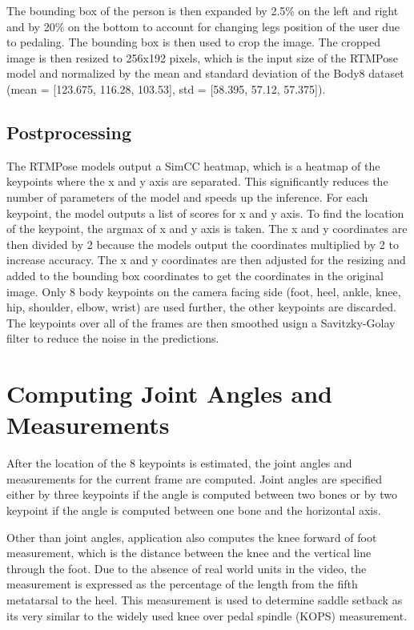 The bounding box of the person is then expanded by 2.5\% on the left and right and by 20\% on the bottom to account for changing legs position of the user due to pedaling. The bounding box is then used to crop the image. The cropped image is then resized to 256x192 pixels, which is the input size of the RTMPose model and normalized by the mean and standard deviation of the Body8 dataset (mean = [123.675, 116.28, 103.53], std = [58.395, 57.12, 57.375]).

\subsection{Postprocessing}
The RTMPose models output a SimCC \cite{simcc} heatmap, which is a heatmap of the keypoints where the x and y axis are separated. This significantly reduces the number of parameters of the model and speeds up the inference. For each keypoint, the model outputs a list of scores for x and y axis. To find the location of the keypoint, the argmax of x and y axis is taken. The x and y coordinates are then divided by 2 because the models output the coordinates multiplied by 2 to increase accuracy. The x and y coordinates are then adjusted for the resizing and added to the bounding box coordinates to get the coordinates in the original image. Only 8 body keypoints on the camera facing side (foot, heel, ankle, knee, hip, shoulder, elbow, wrist) are used further, the other keypoints are discarded. The keypoints over all of the frames are then smoothed usign a Savitzky-Golay filter \cite{savgol} to reduce the noise in the predictions.

\section{Computing Joint Angles and Measurements}
\label{computing_joint_angles}

After the location of the 8 keypoints is estimated, the joint angles and measurements for the current frame are computed. Joint angles are specified either by three keypoints if the angle is computed between two bones or by two keypoint if the angle is computed between one bone and the horizontal axis.

Other than joint angles, application also computes the knee forward of foot measurement, which is the distance between the knee and the vertical line through the foot. Due to the absence of real world units in the video, the measurement is expressed as the percentage of the length from the fifth metatarsal to the heel. This measurement is used to determine saddle setback as its very similar to the widely used knee over pedal spindle (KOPS) measurement.

